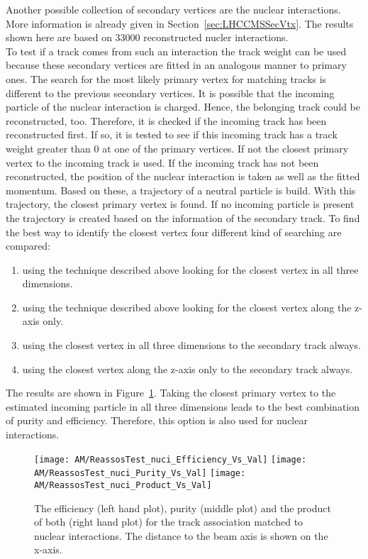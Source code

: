 Another possible collection of secondary vertices are the nuclear interactions. More information is already given in Section~\ref{sec:LHCCMSSecVtx}. The results shown here are based on 33000 reconstructed nucler interactions. \\
To test if a track comes from such an interaction the track weight can be used because these secondary vertices are fitted in an analogous manner to primary ones.  The search for the most likely primary vertex for matching tracks is different to the previous secondary vertices. It is possible that the incoming particle of the nuclear interaction is charged. Hence, the belonging track could be reconstructed, too. Therefore, it is checked if the incoming track has been reconstructed first. If so, it is tested to see if this incoming track has a track weight greater than 0 at one of the primary vertices. If not the closest primary vertex to the incoming track is used. If the incoming track has not been reconstructed, the position of the nuclear interaction is taken as well as the fitted momentum. Based on these, a trajectory of a neutral particle is build. With this trajectory, the closest primary vertex is found. If no incoming particle is present the trajectory is created based on the information of the secondary track. To find the best way to identify the closest vertex four different kind of searching are compared: 
\begin{enumerate}
\item using the technique described above looking for the closest vertex in all three dimensions.
\item using the technique described above looking for the closest vertex along the z-axis only.
\item using the closest vertex in all three dimensions to the secondary track always. 
\item using the closest vertex along the z-axis only to the secondary track always. 
\end{enumerate}
The results are shown in Figure~\ref{plot:AMWFSVnuciEffAndPurSO}. Taking the closest primary vertex to the estimated incoming particle in all three dimensions leads to the best combination of purity and efficiency. Therefore, this option is also used for nuclear interactions.

\begin{figure}[!ht]
  \centering
  \texttt{[image: AM/ReassosTest\_nuci\_Efficiency\_Vs\_Val]}
  \texttt{[image: AM/ReassosTest\_nuci\_Purity\_Vs\_Val]}
  \texttt{[image: AM/ReassosTest\_nuci\_Product\_Vs\_Val]}
  \caption[Efficiency, purity and their product of the association with nuclear interactions for different search options as a function of distance to the beam axis]{The efficiency (left hand plot), purity (middle plot) and the product of both (right hand plot) for the track association matched to nuclear interactions. The distance to the beam axis is shown on the x-axis.\label{plot:AMWFSVnuciEffAndPurSO}}
\end{figure}

